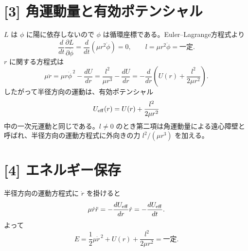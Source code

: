\documentclass[11pt,a4paper]{article}
\begin{document}
\section*{[3] 角運動量と有効ポテンシャル}
$L$ は $\phi$ に陽に依存しないので $\phi$ は循環座標である。Euler--Lagrange方程式より
\begin{equation}
 \frac{d}{dt}\frac{\partial L}{\partial\dot\phi}
 =\frac{d}{dt}(\mu r^2\dot\phi)=0,
 \qquad \boxed{l=\mu r^2\dot\phi=\text{一定}.}
\end{equation}
$r$ に関する方程式は
\begin{equation}
 \mu\ddot r=\mu r\dot\phi^{\,2}-\frac{dU}{dr}
 =\frac{l^2}{\mu r^3}-\frac{dU}{dr}
 =-\frac{d}{dr}\left(U(r)+\frac{l^2}{2\mu r^2}\right).
\end{equation}
したがって半径方向の運動は、有効ポテンシャル
\begin{equation}
 U_{\rm eff}(r)=U(r)+\frac{l^2}{2\mu r^2}
\end{equation}
中の一次元運動と同じである。$l\ne0$ のとき第二項は角運動量による遠心障壁と呼ばれ、半径方向の運動方程式に外向きの力 $l^2/(\mu r^3)$ を加える。

\section*{[4] エネルギー保存}
半径方向の運動方程式に $\dot r$ を掛けると
\begin{equation}
 \mu\dot r\ddot r=-\frac{dU_{\rm eff}}{dr}\dot r
 =-\frac{dU_{\rm eff}}{dt}.
\end{equation}
よって
\begin{equation}
 \boxed{E=\frac12\mu\dot r^{\,2}+U(r)+\frac{l^2}{2\mu r^2}
 =\text{一定}.}
\end{equation}
\end{document}
